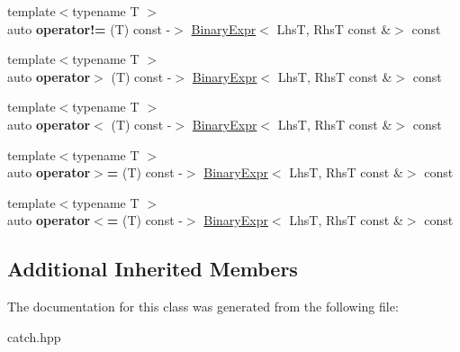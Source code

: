 \begin{DoxyCompactItemize}
{\footnotesize template$<$typename T $>$ }\\auto {\bfseries operator!=} (T) const -\/$>$ \hyperlink{classCatch_1_1BinaryExpr}{Binary\+Expr}$<$ LhsT, RhsT const \&$>$ const
\item 
\mbox{\label{classCatch_1_1BinaryExpr_a70b66bfaa6df6f8d04e243fda3e0e1e4}} 
{\footnotesize template$<$typename T $>$ }\\auto {\bfseries operator$>$} (T) const -\/$>$ \hyperlink{classCatch_1_1BinaryExpr}{Binary\+Expr}$<$ LhsT, RhsT const \&$>$ const
\item 
\mbox{\label{classCatch_1_1BinaryExpr_a8328cde75134e02d7d44c5277db96c09}} 
{\footnotesize template$<$typename T $>$ }\\auto {\bfseries operator$<$} (T) const -\/$>$ \hyperlink{classCatch_1_1BinaryExpr}{Binary\+Expr}$<$ LhsT, RhsT const \&$>$ const
\item 
\mbox{\label{classCatch_1_1BinaryExpr_a334b84ac38c19c7c961a6d974a6c7d73}} 
{\footnotesize template$<$typename T $>$ }\\auto {\bfseries operator$>$=} (T) const -\/$>$ \hyperlink{classCatch_1_1BinaryExpr}{Binary\+Expr}$<$ LhsT, RhsT const \&$>$ const
\item 
\mbox{\label{classCatch_1_1BinaryExpr_a8773a729df3a465cad4e270e912db436}} 
{\footnotesize template$<$typename T $>$ }\\auto {\bfseries operator$<$=} (T) const -\/$>$ \hyperlink{classCatch_1_1BinaryExpr}{Binary\+Expr}$<$ LhsT, RhsT const \&$>$ const
\end{DoxyCompactItemize}
\subsection*{Additional Inherited Members}


The documentation for this class was generated from the following file\+:\begin{DoxyCompactItemize}
\item 
catch.\+hpp\end{DoxyCompactItemize}
